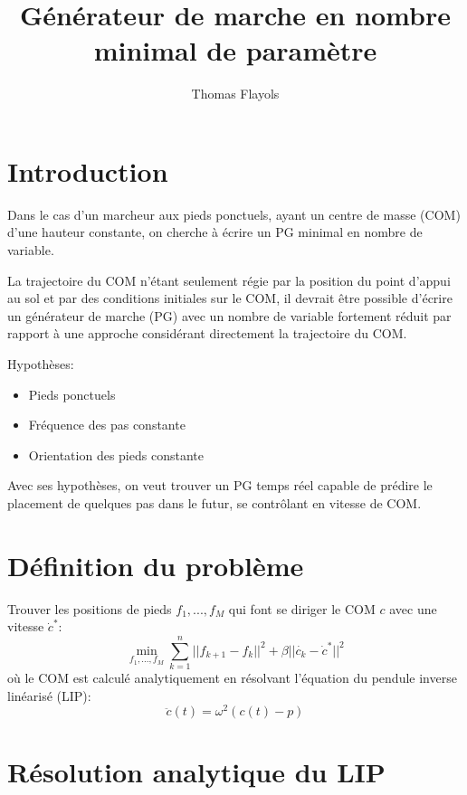 \documentclass[10pt,a4paper]{article}
\begin{document}
\title{Générateur de marche en nombre minimal de paramètre}
\author{Thomas Flayols}
\maketitle
\section*{Introduction}
Dans le cas d'un marcheur aux pieds ponctuels, ayant un centre de masse (COM) d'une hauteur constante, on cherche à écrire un PG minimal en nombre de variable.

La  trajectoire du COM n'étant seulement régie par la position du point d’appui au sol et par des conditions initiales sur le COM, il devrait être possible d'écrire un générateur de marche (PG) avec un nombre de variable fortement réduit par rapport à une approche considérant directement la trajectoire du COM.

Hypothèses:
\begin{itemize}
\item Pieds ponctuels
\item Fréquence des pas constante
\item Orientation des pieds constante
\end{itemize}

Avec ses hypothèses, on veut trouver un PG temps réel capable de prédire le placement de quelques pas dans le futur, se contrôlant en vitesse de COM.
\section{Définition du problème}

Trouver les positions de pieds $f_1,...,f_M$ qui font se diriger le COM $c$ avec une vitesse $\dot{c}^*$:
\begin{equation}\label{problem}
\min_{ f_1,...,f_M} \sum\limits_{k=1}^n ||f_{k+1}-f_{k}||^2 + \beta||\dot{c_k}-\dot{c}^*||^2
\end{equation}
où le COM est calculé analytiquement en résolvant l'équation du pendule inverse linéarisé (LIP):
\begin{equation}\label{lip}
\ddot{c}(t)=\omega^2 (c(t)-p)
\end{equation}

\section{Résolution analytique du LIP}
\end{document}
